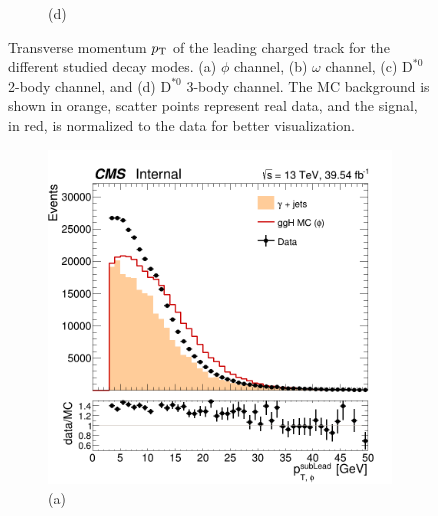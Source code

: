\begin{figure}[!ht]
\begin{subfigure}[t]{0.50\mylength}
        \vspace*{-0.2cm}
        \caption{\footnotesize (d)}
    \end{subfigure}%
\caption{Transverse momentum $p_\text{T}$ of the leading charged track for the different studied decay modes. (a) $\phi$ channel, (b) $\omega$ channel, (c) $\text{D}^{*0}$ 2-body channel, and (d) $\text{D}^{*0}$ 3-body channel. The MC background is shown in orange, scatter points represent real data, and the signal, in red, is normalized to the data for better visualization.}
\label{fig:lead_pt_data}
    \vspace*{-0.0cm}
\end{figure}

\begin{figure}[!ht]
    \captionsetup[subfigure]{labelformat=empty}
    \vspace*{-0.2cm}
    \centering
    \setlength{\mylength}{\textwidth}
    \begin{subfigure}[t]{0.50\mylength}
        \centering
        \includegraphics[width=0.49\mylength]{resources/plots/Phi3_sublead_pt.png}
        \vspace*{-0.2cm}
        \caption{\footnotesize (a)}
    \end{subfigure}%
    \begin{subfigure}[t]{0.50\mylength}

\end{subfigure}
\end{figure}
